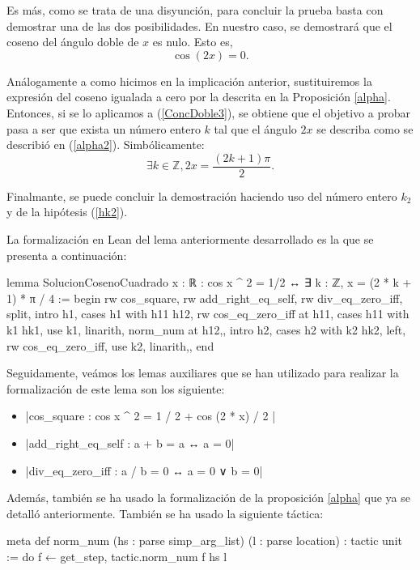 \begin{demostracion}
    Es más, como se trata de una disyunción, para concluir la
    prueba basta con demostrar una de las dos posibilidades.
    En nuestro caso, se demostrará que el coseno del ángulo doble
    de \(x\) es nulo. Esto es,
    \begin{equation}\label{ConcDoble3}
      \cos(2x)=0.
    \end{equation}

    Análogamente a como hicimos en la implicación anterior,
    sustituiremos la expresión del coseno igualada a cero por la
    descrita en la Proposición \ref{alpha}. Entonces, si se lo
    aplicamos a (\ref{ConcDoble3}), se obtiene que el objetivo
    a probar pasa a ser que exista un número entero \(k\) tal que
    el ángulo \(2x\) se describa como se describió en
    (\ref{alpha2}). Simbólicamente:
    \begin{equation}
      ∃k∈ ℤ, 2x=\frac{(2k+1)π}{2}.
    \end{equation}

    Finalmante, se puede concluir la demostración haciendo uso del
    número entero \(k_2\) y de la hipótesis (\ref{hk2}). 
    \end{demostracion}

La formalización en Lean del lema anteriormente desarrollado es
la que se presenta a continuación:
\begin{leancode}
lemma SolucionCosenoCuadrado {x : ℝ} : cos x ^ 2 = 1/2 ↔
∃ k : ℤ, x = (2 * k + 1) * π / 4 :=
begin
  rw cos_square,
  rw add_right_eq_self,
  rw div_eq_zero_iff,
  split,
  {intro h1,
  cases h1 with h11 h12,
  rw cos_eq_zero_iff at h11,
  cases h11 with k1 hk1,
  use k1,
  linarith,
  norm_num at h12,},
  {intro h2, 
  cases h2 with k2 hk2,
  left,
  rw cos_eq_zero_iff,
  use k2,
  linarith,},
end
\end{leancode}

Seguidamente, veámos los lemas auxiliares que se han utilizado
para realizar la formalización de este lema son los siguiente:
\begin{itemize}
\item {}|cos_square : cos x ^ 2 = 1 / 2 + cos (2 * x) / 2 |
\item {}|add_right_eq_self : a + b = a ↔ a = 0|
\item {}|div_eq_zero_iff : a / b = 0 ↔ a = 0 ∨ b = 0|
\end{itemize}

Además, también se ha usado la formalización de la proposición
\ref{alpha} que ya se detalló anteriormente. También se ha usado
la siguiente táctica:
\begin{leancode}
meta def norm_num (hs : parse simp_arg_list) (l : parse location) :
tactic unit :=
do f ← get_step, tactic.norm_num f hs l
\end{leancode}

